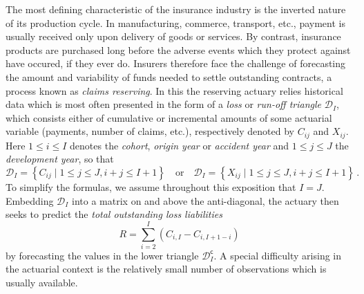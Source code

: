 \documentclass[a4paper]{book}
\begin{document}
The most defining characteristic of the insurance industry is the inverted nature of its production cycle. In manufacturing, commerce, transport, etc., payment is usually received only upon delivery of goods or services. By contrast, insurance products are purchased long before the adverse events which they protect against have occured, if they ever do. Insurers therefore face the challenge of forecasting the amount and variability of funds needed to settle outstanding contracts, a process known as \emph{claims reserving}. In this the reserving actuary relies historical data which is most often presented in the form of a \emph{loss} or \emph{run-off triangle} $\mathcal{D}_I$, which consists either of cumulative or incremental amounts of some actuarial variable (payments, number of claims, etc.), respectively denoted by $C_{ij}$ and $X_{ij}$. Here $1 \leq i \leq I$ denotes the \emph{cohort}, \emph{origin year} or \emph {accident year} and $1 \leq j \leq J$ the \emph{development year}, so that
\begin{equation}
  \mathcal{D}_I = \left  \{ C_{ij} \mid 1 \leq j \leq J, i + j \leq I + 1 \right \}
  \quad \text{or} \quad
  \mathcal{D}_I = \left  \{ X_{ij} \mid 1 \leq j \leq J, i + j \leq I + 1 \right \} \,.
\end{equation}
To simplify the formulas, we assume throughout this exposition that $I = J$. Embedding $\mathcal{D}_I$ into a matrix on and above the anti-diagonal, the actuary then seeks to predict the \emph{total outstanding loss liabilities}
\begin{equation}
  R = \sum_{i = 2}^I (C_{i, I} - C_{i, I + 1- i})
\end{equation}
by forecasting the values in the lower triangle $\mathcal{D}^{\mathsf{c}}_I$. A special difficulty arising in the actuarial context is the relatively small number of observations which is usually available.
\end{document}
